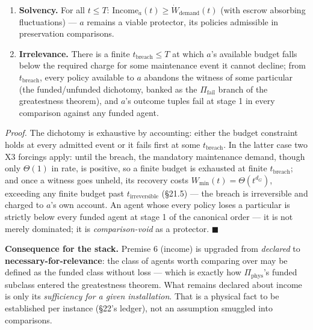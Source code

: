 \documentclass[
]{article}
\providecommand{\tightlist}{%
  \setlength{\itemsep}{0pt}\setlength{\parskip}{0pt}}
\begin{document}
\begin{enumerate}
\def\labelenumi{\arabic{enumi}.}
\tightlist
\item
  \textbf{Solvency.} For all \(t\le T\):
  \(\mathrm{Income}_a(t)\ge\dot W_{\mathrm{demand}}(t)\) (with escrow
  absorbing fluctuations) --- \(a\) remains a viable protector, its
  policies admissible in preservation comparisons.
\item
  \textbf{Irrelevance.} There is a finite \(t_{\mathrm{breach}}\le T\)
  at which \(a\)'s available budget falls below the required charge for
  some maintenance event it cannot decline; from
  \(t_{\mathrm{breach}}\), every policy available to \(a\) abandons the
  witness of some particular (the
  f\allowbreak{}u\allowbreak{}n\allowbreak{}d\allowbreak{}e\allowbreak{}d\allowbreak{}/\allowbreak{}u\allowbreak{}n\allowbreak{}f\allowbreak{}u\allowbreak{}n\allowbreak{}d\allowbreak{}e\allowbreak{}d
  dichotomy, banked as the \(\Pi_{\mathrm{fail}}\) branch of the
  greatestness theorem), and \(a\)'s outcome tuples fail at stage 1 in
  every comparison against any funded agent.
\end{enumerate}

\emph{Proof.} The dichotomy is exhaustive by accounting: either the
budget constraint holds at every admitted event or it fails first at
some \(t_{\mathrm{breach}}\). In the latter case two X3 forcings apply:
until the breach, the mandatory maintenance demand, though only
\(\Theta(1)\) in rate, is positive, so a finite budget is exhausted at
finite \(t_{\mathrm{breach}}\); and once a witness goes unheld, its
recovery costs \(W_{\min}(t)=\Theta(t^{d_G})\), exceeding any finite
budget past \(t_{\mathrm{irreversible}}\) (§21.5) --- the breach is
irreversible and charged to \(a\)'s own account. An agent whose every
policy loses a particular is strictly below every funded agent at stage
1 of the canonical order --- it is not merely dominated; it is
\emph{comparison-void} as a protector. \(\blacksquare\)

\textbf{Consequence for the stack.} Premise 6 (income) is upgraded from
\emph{declared} to \textbf{necessary-for-relevance}: the class of agents
worth comparing over may be defined as the funded class without loss ---
which is exactly how \(\Pi_{\mathrm{phys}}\)'s funded subclass entered
the greatestness theorem. What remains declared about income is only its
\emph{sufficiency for a given installation}. That is a physical fact to
be established per instance (§22's ledger), not an assumption smuggled
into comparisons.
\end{document}
